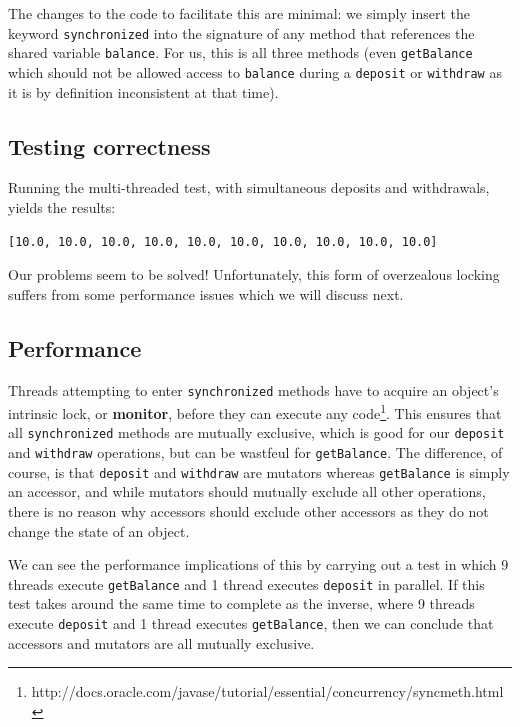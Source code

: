 \documentclass[a4paper,12pt]{kth-mag}
\begin{document}
The changes to the code to facilitate this are minimal: we simply insert the keyword \texttt{synchronized} into the signature of any method that references the shared variable \texttt{balance}. For us, this is all three methods (even \texttt{getBalance} which should not be allowed access to \texttt{balance} during a \texttt{deposit} or \texttt{withdraw} as it is by definition inconsistent at that time).

\subsection{Testing correctness}

Running the multi-threaded test, with simultaneous deposits and withdrawals, yields the results:

\begin{listing}[H]
	\begin{verbatim}
[10.0, 10.0, 10.0, 10.0, 10.0, 10.0, 10.0, 10.0, 10.0, 10.0] 
	\end{verbatim}
\end{listing}

Our problems seem to be solved! Unfortunately, this form of overzealous locking suffers from some performance issues which we will discuss next.

\subsection{Performance}

Threads attempting to enter \texttt{synchronized} methods have to acquire an object's intrinsic lock, or \textbf{monitor}, before they can execute any code\footnote{http://docs.oracle.com/javase/tutorial/essential/concurrency/syncmeth.html}. This ensures that all \texttt{synchronized} methods are mutually exclusive, which is good for our \texttt{deposit} and \texttt{withdraw} operations, but can be wastfeul for \texttt{getBalance}. The difference, of course, is that \texttt{deposit} and \texttt{withdraw} are mutators whereas \texttt{getBalance} is simply an accessor, and while mutators should mutually exclude all other operations, there is no reason why accessors should exclude other accessors as they do not change the state of an object. 

We can see the performance implications of this by carrying out a test in which 9 threads execute \texttt{getBalance} and 1 thread executes \texttt{deposit} in parallel. If this test takes around the same time to complete as the inverse, where 9 threads execute \texttt{deposit} and 1 thread executes \texttt{getBalance}, then we can conclude that accessors and mutators are all mutually exclusive.
\end{document}
